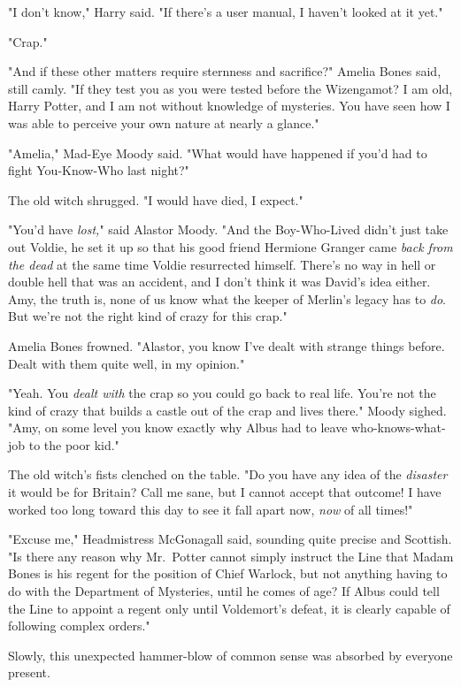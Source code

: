 "I don't know," Harry said. "If there's a user manual, I haven't looked at it
yet."

"Crap."

"And if these other matters require sternness and sacrifice?" Amelia Bones
said, still camly. "If they test you as you were tested before the Wizengamot?
I am old, Harry Potter, and I am not without knowledge of mysteries. You have
seen how I was able to perceive your own nature at nearly a glance."

"Amelia," Mad-Eye Moody said. "What would have happened if you'd had to fight
You-Know-Who last night?"

The old witch shrugged. "I would have died, I expect."

"You'd have \emph{lost,}" said Alastor Moody. "And the Boy-Who-Lived didn't
just take out Voldie, he set it up so that his good friend Hermione Granger
came \emph{back from the dead} at the same time Voldie resurrected himself.
There's no way in hell or double hell that was an accident, and I don't think
it was David's idea either. Amy, the truth is, none of us know what the keeper
of Merlin's legacy has to \emph{do}. But we're not the right kind of crazy for
this crap."

Amelia Bones frowned. "Alastor, you know I've dealt with strange things before.
Dealt with them quite well, in my opinion."

"Yeah. You \emph{dealt with} the crap so you could go back to real life. You're
not the kind of crazy that builds a castle out of the crap and lives there."
Moody sighed. "Amy, on some level you know exactly why Albus had to leave
who-knows-what-job to the poor kid."

The old witch's fists clenched on the table. "Do you have any idea of the
\emph{disaster} it would be for Britain? Call me sane, but I cannot accept that
outcome! I have worked too long toward this day to see it fall apart now,
\emph{now} of all times!"

"Excuse me," Headmistress McGonagall said, sounding quite precise and Scottish.
"Is there any reason why Mr.~Potter cannot simply instruct the Line that Madam
Bones is his regent for the position of Chief Warlock, but not anything having
to do with the Department of Mysteries, until he comes of age? If Albus could
tell the Line to appoint a regent only until Voldemort's defeat, it is clearly
capable of following complex orders."

Slowly, this unexpected hammer-blow of common sense was absorbed by everyone
present.

